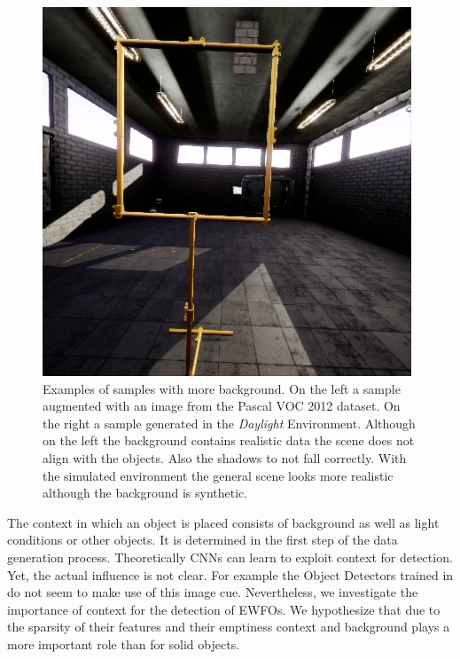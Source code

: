 \begin{figure}[hbtp]
\begin{minipage}{0.3\textwidth}
	\end{minipage}
	\begin{minipage}{0.3\textwidth}
		\includegraphics[width=\textwidth]{fig/sim}
	\end{minipage}
	\caption{Examples of samples with more background. On the left a sample augmented with an image from the Pascal VOC 2012 dataset. On the right a sample generated in the \textit{Daylight} Environment. Although on the left the background contains realistic data the scene does not align with the objects. Also the shadows to not fall correctly. With the simulated environment the general scene looks more realistic although the background is synthetic.}
	\label{fig:sim_vs_voc}
\end{figure}



The context in which an object is placed consists of background as well as light conditions or other objects. It is determined in the first step of the data generation process. Theoretically \acp{CNN} can learn to exploit context for detection. Yet, the actual influence is not clear. For example the Object Detectors trained in \cite{Peng} do not seem to make use of this image cue. Nevertheless, we investigate the importance of context for the detection of \acp{EWFO}. We hypothesize that due to the sparsity of their features and their emptiness context and background plays a more important role than for solid objects.

